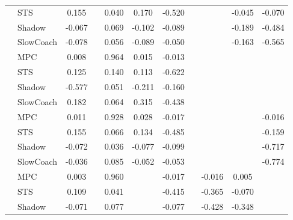 \begin{tabular}{|l|l|*{9}{c|}}
                                                           & STS &    0.155 &        &     0.040 &  0.170 & -0.520 &     &      &  -0.045 &   -0.070 \\
                                                           & Shadow &   -0.067 &        &     0.069 & -0.102 & -0.089 &     &      &  -0.189 &   -0.484 \\
                                                           & SlowCoach &   -0.078 &        &     0.056 & -0.089 & -0.050 &     &      &  -0.163 &   -0.565 \\
\midrule
[True, False, True, True, True, False, False, False, False] & MPC &    0.008 &        &     0.964 &  0.015 & -0.013 &     &      &      &       \\
                                                           & STS &    0.125 &        &     0.140 &  0.113 & -0.622 &     &      &      &       \\
                                                           & Shadow &   -0.577 &        &     0.051 & -0.211 & -0.160 &     &      &      &       \\
                                                           & SlowCoach &    0.182 &        &     0.064 &  0.315 & -0.438 &     &      &      &       \\
\midrule
[True, False, True, True, True, False, False, False, True] & MPC &    0.011 &        &     0.928 &  0.028 & -0.017 &     &      &      &   -0.016 \\
                                                           & STS &    0.155 &        &     0.066 &  0.134 & -0.485 &     &      &      &   -0.159 \\
                                                           & Shadow &   -0.072 &        &     0.036 & -0.077 & -0.099 &     &      &      &   -0.717 \\
                                                           & SlowCoach &   -0.036 &        &     0.085 & -0.052 & -0.053 &     &      &      &   -0.774 \\
\midrule
[True, False, True, False, True, False, True, True, False] & MPC &    0.003 &        &     0.960 &     & -0.017 &     &  -0.016 &   0.005 &       \\
                                                           & STS &    0.109 &        &     0.041 &     & -0.415 &     &  -0.365 &  -0.070 &       \\
                                                           & Shadow &   -0.071 &        &     0.077 &     & -0.077 &     &  -0.428 &  -0.348 &       \\

\end{tabular}
